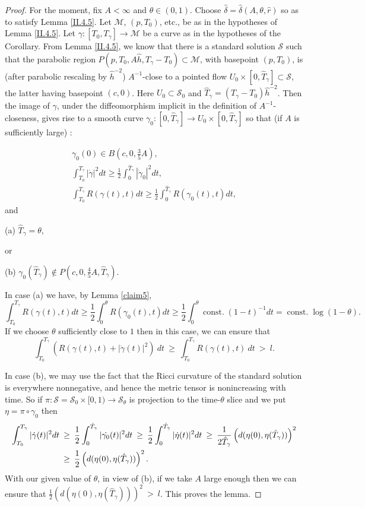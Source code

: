 \documentclass[12pt]{amsart}
\newcommand{\const}{\operatorname{const.}}
\newcommand{\M}{{\mathcal M}}
\newcommand{\s}{{\mathcal S}}
\renewcommand{\th}{\theta}
\newcommand{\de}{\delta}
\newcommand{\ga}{\gamma}
\newcommand{\ra}{\rightarrow}
\numberwithin{equation}{section}
\theoremstyle{plain}
\theoremstyle{definition}
\theoremstyle{remark}
\begin{document}
\begin{proof}
For the moment, fix $A<\infty$ and $\th\in (0,1)$. 
Choose $\hat\de=\hat\de(A,\th,\hat r)$
so as to satisfy
Lemma \ref{II.4.5}.   Let $\M$, $(p,T_0)$, etc.,
be as in the hypotheses of Lemma \ref{II.4.5}. Let $\ga:[T_0,T_\ga]\ra\M$
be a curve as in the hypotheses of the Corollary.
From Lemma \ref{II.4.5}, we know that there is a standard solution
$\s$ such that  the parabolic region
$P(p,T_0,A\hat h,T_\ga-T_0) \subset \M$, with basepoint $(p,T_0)$, is
(after parabolic rescaling by $\hat h^{-2}$) $A^{-1}$-close
to a  pointed flow $U_0\times [0,\hat T_\ga] \subset \s$, the latter
having basepoint $(c,0)$. Here
$U_0\subset \s_0$ and $\hat T_\ga= (T_\ga-T_0)\hat h^{-2}$.
Then the image of $\ga$, under the diffeomorphism implicit in the definition
of $A^{-1}$-closeness, gives rise to a smooth curve 
$\ga_0:[0,\hat T_\ga]\ra U_0\times [0,\hat T_\ga]$ so that
(if $A$ is sufficiently large) :

\begin{gather}
\ga_0(0)\in B(c,0,\frac35 A),\\
\int_{T_0}^{T_\ga}|\dot{\ga}|^2dt
\geq \frac12 \int_0^{\hat T_\ga}|\dot{\ga}_0|^2dt,\\
\int_{T_0}^{T_\ga}R({\ga}(t),t)dt
\geq \frac12 \int_0^{\hat T_\ga}R({\ga}_0(t),t)dt,
\end{gather}
and

(a) $\hat T_\ga=\th$,

or

(b) $\ga_0(\hat T_\ga)\not\in P(c,0,\frac45 A,\hat T_\ga)$.

\noindent
In case (a) we have, by Lemma \ref{claim5},
\begin{equation}
\int_{T_0}^{T_\ga} R(\ga(t), t)dt\geq 
\frac12 \int_0^\th R(\ga_0(t),t)dt
\geq \frac12\int_0^\th \const(1-t)^{-1}dt=\const \log(1-\th).
\end{equation}
If we choose $\th$ sufficiently close to $1$ then in this case,
we can ensure that
\begin{equation}
\int_{T_0}^{T_\ga} \left( R(\gamma(t), t)+|\dot{\ga}(t)|^2 \right) \: dt
\: \ge \: 
\int_{T_0}^{T_\ga} R(\gamma(t), t) \: dt \: > \: l.
\end{equation}

In case (b), we may use the fact that the Ricci curvature 
of the standard solution is everywhere 
nonnegative,
and hence the metric tensor is nonincreasing with time.  So if
$\pi:\s=\s_0\times [0,1)\ra\s_\th$ is projection
to the time-$\th$ slice and we put $\eta= \pi\circ\ga_0$
then
\begin{align}
\int_{T_0}^{T_\ga}|\dot{\ga}(t)|^2dt \: 
& \geq \: \frac12 \int_0^{\hat T_\ga}|\dot{\ga_0}(t)|^2dt \: 
\geq \: \frac12 \int_0^{\hat T_\ga}|\dot{\eta}(t)|^2dt
\: \geq \: 
\frac{1}{2 \hat T_\ga} \left(d(\eta(0),\eta(\hat T_\ga))\right)^2 \\
& \ge \:
\frac{1}{2} \left(d(\eta(0),\eta(\hat T_\ga))\right)^2. \notag
\end{align}
With our given value of $\th$, in view of (b), if we take $A$ large enough 
then we can ensure that $\frac12 \left(d(\eta(0),\eta(\hat T_\ga))\right)^2
\: > \: l$.  This proves the lemma.
\end{proof}
\end{document}
